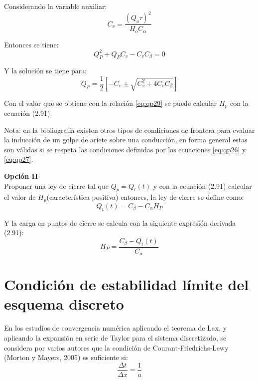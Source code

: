 \documentclass[letterpaper]{report}
\begin{document}
Considerando la variable auxiliar:
\begin{equation*}
	C_v=\dfrac{(Q_o\tau)^2}{H_oC_\alpha}
\end{equation*}

Entonces se tiene:
\begin{equation*}
	Q_P^2+Q_PC_v-C_vC_\beta=0
\end{equation*}

Y la solución se tiene para:
\begin{equation}
	Q_P=\dfrac{1}{2}\left[-C_v\pm\sqrt{C_v^2+4C_vC_\beta}\right]
\label{eq:qp29}
\end{equation}

Con el valor que se obtiene con la relación \ref{eq:qp29} se puede calcular $H_p$ con la ecuación (2.91).\bigskip

Nota: en la bibliografía existen otros tipos de condiciones de frontera para evaluar la inducción de un golpe de ariete sobre una conducción, en forma general estas son válidas si se respeta las condiciones definidas por las ecuaciones \ref{eq:qp26} y \ref{eq:qp27}.\bigskip

\textbf{Opción II}\\
Proponer una ley de cierre tal que $Q_p=Q_t(t)$ y con la ecuación (2.91) calcular el valor de $H_p$(característica positiva) entonces, la ley de cierre se define como:
\begin{equation}
	Q_t(t)=C_\beta-C_\alpha H_P
\label{eq:qp30}
\end{equation}

Y la carga en puntos de cierre se calcula con la siguiente expresión derivada (2.91):
\begin{equation}
	H_P=\frac{C_\beta-Q_t(t)}{C_\alpha}
\end{equation}

\section{Condición de estabilidad límite del esquema discreto}
En los estudios de convergencia numérica aplicando el teorema de Lax, y aplicando la expansión en serie de Taylor para el sistema discretizado, se considera por varios autores que la condición de Courant-Friedrichs-Lewy (Morton y Mayers, 2005) es suficiente si:
\begin{equation}
	\dfrac{\Delta t}{\Delta x}=\dfrac{1}{a}
\label{eq:qp31}
\end{equation}
\end{document}
